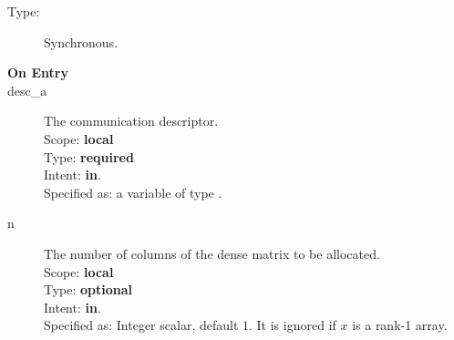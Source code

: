 

%
%


\begin{description}
\item[Type:] Synchronous.
\item[\bf On Entry]
\item[desc\_a] The communication descriptor.\\
Scope: {\bf local} \\
Type: {\bf required}\\
Intent: {\bf in}.\\
Specified as: a variable of type \descdata.\\
\item[n] The number of columns of the dense matrix to be allocated.\\
Scope: {\bf local} \\
Type: {\bf optional}\\
Intent: {\bf in}.\\
Specified as: Integer scalar, default $1$. It is ignored if $x$ is a
rank-1 array. 
\end{description}

